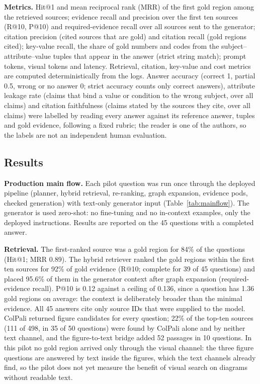 \documentclass[conference]{IEEEtran}
\begin{document}
\textbf{Metrics.} Hit@1 and mean reciprocal rank (MRR) of the first gold region among the retrieved sources; evidence recall and precision over the first ten sources (R@10, P@10) and required-evidence recall over all sources sent to the generator; citation precision (cited sources that are gold) and citation recall (gold regions cited); key-value recall, the share of gold numbers and codes from the subject--attribute--value tuples that appear in the answer (strict string match); prompt tokens, visual tokens and latency. Retrieval, citation, key-value and cost metrics are computed deterministically from the logs. Answer accuracy (correct 1, partial 0.5, wrong or no answer 0; strict accuracy counts only correct answers), attribute leakage rate (claims that bind a value or condition to the wrong subject, over all claims) and citation faithfulness (claims stated by the sources they cite, over all claims) were labelled by reading every answer against its reference answer, tuples and gold evidence, following a fixed rubric; the reader is one of the authors, so the labels are not an independent human evaluation.

\subsection{Results}
\textbf{Production main flow.} Each pilot question was run once through the deployed pipeline (planner, hybrid retrieval, re-ranking, graph expansion, evidence pods, checked generation) with text-only generator input (Table~\ref{tab:mainflow}). The generator is used zero-shot: no fine-tuning and no in-context examples, only the deployed instructions. Results are reported on the 45 questions with a completed answer.

\textbf{Retrieval.} The first-ranked source was a gold region for 84\% of the questions (Hit@1; MRR 0.89). The hybrid retriever ranked the gold regions within the first ten sources for 92\% of gold evidence (R@10; complete for 39 of 45 questions) and placed 95.6\% of them in the generator context after graph expansion (required-evidence recall). P@10 is 0.12 against a ceiling of 0.136, since a question has 1.36 gold regions on average: the context is deliberately broader than the minimal evidence. All 45 answers cite only source IDs that were supplied to the model. ColPali returned figure candidates for every question; 22\% of the top-ten sources (111 of 498, in 35 of 50 questions) were found by ColPali alone and by neither text channel, and the figure-to-text bridge added 52 passages in 10 questions. In this pilot no gold region arrived only through the visual channel: the three figure questions are answered by text inside the figures, which the text channels already find, so the pilot does not yet measure the benefit of visual search on diagrams without readable text.
\end{document}

